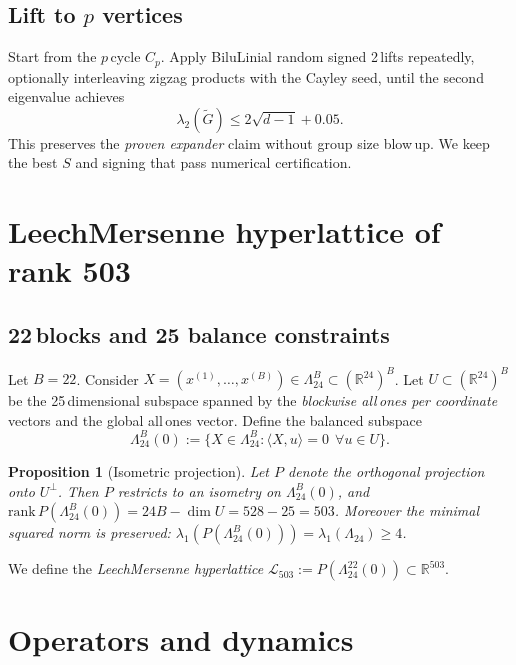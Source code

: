\documentclass[11pt]{article}
\newtheorem{proposition}{Proposition}
\theoremstyle{definition}
\newcommand{\R}{\mathbb R}
\newcommand{\LLeech}{\Lambda_{24}}
\newcommand{\Lproj}{\mathcal L_{503}}
\begin{document}
\subsection{Lift to $p$ vertices} \label{sec:lift-to-p}
Start from the \(p\)\,cycle \(C_p\). Apply Bilu\textendash Linial random signed 2\,lifts repeatedly, optionally interleaving zig\textendash zag products with the Cayley seed, until the second eigenvalue achieves
\begin{equation}
\lambda_2(\tilde G)\le 2\sqrt{d-1}+0.05.
\end{equation}
This preserves the \emph{proven expander} claim without group size blow\,up. We keep the best \(S\) and signing that pass numerical certification.

\section{Leech\textendash Mersenne hyperlattice of rank 503}
\subsection{22\,blocks and 25 balance constraints}
Let \(B=22\). Consider \(X=(x^{(1)},\ldots,x^{(B)})\in \LLeech^{B}\subset (\R^{24})^{B}\). Let \(U\subset (\R^{24})^B\) be the 25\,dimensional subspace spanned by the \emph{blockwise all\,ones per coordinate} vectors and the global all\,ones vector. Define the balanced subspace
\begin{equation}
\LLeech^{B}(0):=\big\{X\in \LLeech^{B} : \langle X,u\rangle=0\ \ \forall u\in U\big\}.
\end{equation}
\begin{proposition}[Isometric projection]
Let \(P\) denote the orthogonal projection onto \(U^{\perp}\). Then \(P\) restricts to an isometry on \(\LLeech^{B}(0)\), and \(\mathrm{rank}\,P(\LLeech^{B}(0))=24B-\dim U=528-25=503\). Moreover the minimal squared norm is preserved: \(\lambda_1(P(\LLeech^{B}(0)))=\lambda_1(\LLeech)\ge 4\).
\end{proposition}
We define the \emph{Leech\textendash Mersenne hyperlattice} \(\Lproj:=P(\LLeech^{22}(0))\subset \R^{503}\).

\section{Operators and dynamics}
\end{document}
